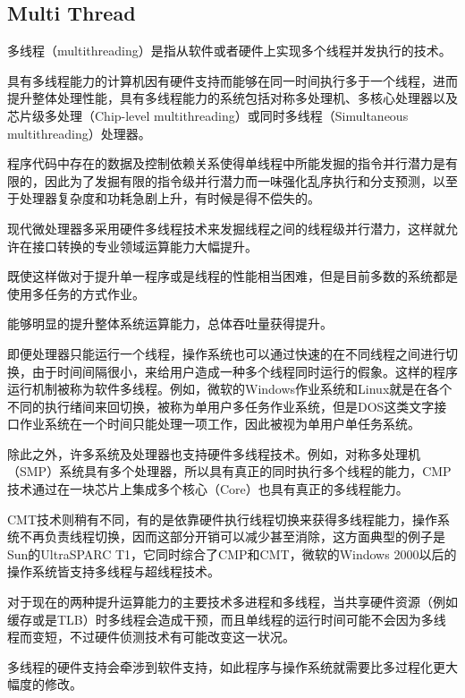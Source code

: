 \subsection{Multi Thread}

多线程（multithreading）是指从软件或者硬件上实现多个线程并发执行的技术。

具有多线程能力的计算机因有硬件支持而能够在同一时间执行多于一个线程，进而提升整体处理性能，具有多线程能力的系统包括对称多处理机、多核心处理器以及芯片级多处理（Chip-level multithreading）或同时多线程（Simultaneous multithreading）处理器。

程序代码中存在的数据及控制依赖关系使得单线程中所能发掘的指令并行潜力是有限的，因此为了发掘有限的指令级并行潜力而一味强化乱序执行和分支预测，以至于处理器复杂度和功耗急剧上升，有时候是得不偿失的。

现代微处理器多采用硬件多线程技术来发掘线程之间的线程级并行潜力，这样就允许在接口转换的专业领域运算能力大幅提升。

\begin{compactitem}
\item 既使这样做对于提升单一程序或是线程的性能相当困难，但是目前多数的系统都是使用多任务的方式作业。
\item 能够明显的提升整体系统运算能力，总体吞吐量获得提升。
\end{compactitem}



即便处理器只能运行一个线程，操作系统也可以通过快速的在不同线程之间进行切换，由于时间间隔很小，来给用户造成一种多个线程同时运行的假象。这样的程序运行机制被称为软件多线程。例如，微软的Windows作业系统和Linux就是在各个不同的执行绪间来回切换，被称为单用户多任务作业系统，但是DOS这类文字接口作业系统在一个时间只能处理一项工作，因此被视为单用户单任务系统。

除此之外，许多系统及处理器也支持硬件多线程技术。例如，对称多处理机（SMP）系统具有多个处理器，所以具有真正的同时执行多个线程的能力，CMP技术通过在一块芯片上集成多个核心（Core）也具有真正的多线程能力。

CMT技术则稍有不同，有的是依靠硬件执行线程切换来获得多线程能力，操作系统不再负责线程切换，因而这部分开销可以减少甚至消除，这方面典型的例子是Sun的UltraSPARC T1，它同时综合了CMP和CMT，微软的Windows 2000以后的操作系统皆支持多线程与超线程技术。

对于现在的两种提升运算能力的主要技术多进程和多线程，当共享硬件资源（例如缓存或是TLB）时多线程会造成干预，而且单线程的运行时间可能不会因为多线程而变短，不过硬件侦测技术有可能改变这一状况。

多线程的硬件支持会牵涉到软件支持，如此程序与操作系统就需要比多过程化更大幅度的修改。

